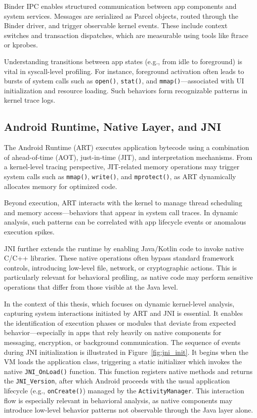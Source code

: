 \documentclass[a4paper,12pt]{report}
\begin{document}
Binder IPC enables structured communication between app components and system services. Messages are serialized as Parcel objects, routed through the Binder driver, and trigger observable kernel events. These include context switches and transaction dispatches, which are measurable using tools like ftrace or kprobes.

Understanding transitions between app states (e.g., from idle to foreground) is vital in syscall-level profiling. For instance, foreground activation often leads to bursts of system calls such as \texttt{open()}, \texttt{stat()}, and \texttt{mmap()}—associated with UI initialization and resource loading. Such behaviors form recognizable patterns in kernel trace logs.

\subsection{Android Runtime, Native Layer, and JNI}
The Android Runtime (ART) executes application bytecode using a combination of ahead-of-time (AOT), just-in-time (JIT), and interpretation mechanisms. From a kernel-level tracing perspective, JIT-related memory operations may trigger system calls such as \texttt{mmap()}, \texttt{write()}, and \texttt{mprotect()}, as ART dynamically allocates memory for optimized code.

Beyond execution, ART interacts with the kernel to manage thread scheduling and memory access—behaviors that appear in system call traces. In dynamic analysis, such patterns can be correlated with app lifecycle events or anomalous execution spikes.

JNI further extends the runtime by enabling Java/Kotlin code to invoke native C/C++ libraries. These native operations often bypass standard framework controls, introducing low-level file, network, or cryptographic actions. This is particularly relevant for behavioral profiling, as native code may perform sensitive operations that differ from those visible at the Java level.

In the context of this thesis, which focuses on dynamic kernel-level analysis, capturing system interactions initiated by ART and JNI is essential. It enables the identification of execution phases or modules that deviate from expected behavior—especially in apps that rely heavily on native components for messaging, encryption, or background communication.
The sequence of events during JNI initialization is illustrated in Figure~\ref{fig:jni_init}.
It begins when the VM loads the application class, triggering a static initializer which invokes
the native \texttt{JNI\_OnLoad()} function. This function registers native methods and returns
the \texttt{JNI\_Version}, after which Android proceeds with the usual application lifecycle
(e.g., \texttt{onCreate()}) managed by the \texttt{ActivityManager}.
This interaction flow is especially relevant in behavioral analysis,
as native components may introduce low-level behavior patterns not observable through the Java layer alone.
\end{document}
